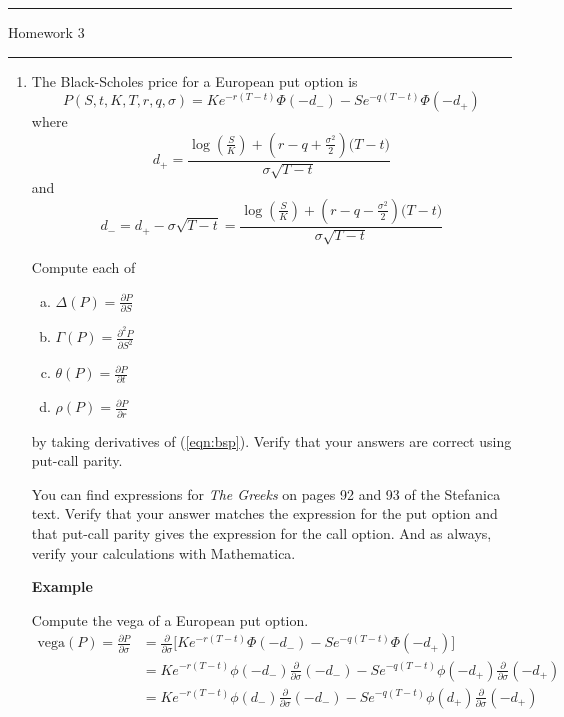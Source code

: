\documentclass[letterpaper,12pt,fleqn]{article}
\theoremstyle{definition}
\begin{document}
\pagestyle{empty}

\hrule \vspace{0.5em}
 \hfill Homework 3 \newline \hrule

\vspace{1em}

\begin{enumerate}
\item The Black-Scholes price for a European put option is
\begin{equation}
P(S, t, K, T, r, q, \sigma) = Ke^{-r(T - t)} \Phi(-d_{-}) - Se^{-q(T - t)} \Phi(-d_{+})
\label{eqn:bsp}
\end{equation}
where
$$d_{+} = \frac{\log\left(\frac{S}{K}\right) + \left(r - q + \frac{\sigma^{2}}{2} \right) \big( T - t \big)}{\sigma \sqrt{T - t}}$$
and
$$d_{-} = d_{+} - \sigma \sqrt{T - t} = \frac{\log\left(\frac{S}{K}\right) + \left(r - q - \frac{\sigma^{2}}{2} \right) \big( T - t \big)}{\sigma \sqrt{T - t}}$$

\vspace{1em}

Compute each of
\begin{enumerate}[(a)]
\item $\displaystyle \Delta(P) = \frac{\partial P}{\partial S}$
\item $\displaystyle \Gamma(P) = \frac{\partial^{2} P}{\partial S^{2}}$
\item $\displaystyle \theta(P) = \frac{\partial P}{\partial t}$
\item $\displaystyle \rho(P) = \frac{\partial P}{\partial r}$
\end{enumerate}

\vspace{1em}

by taking derivatives of (\ref{eqn:bsp}). Verify that your answers are correct using put-call parity.

\vspace{2em}

You can find expressions for \textit{The Greeks} on pages 92 and 93 of the Stefanica text.  Verify that your answer matches the expression for the put option and that put-call parity gives the expression for the call option.  And as always, verify your calculations with Mathematica.



\newpage
\textbf{Example}

Compute the vega of a European put option.
\begin{align*}
\mbox{vega}(P) = \frac{\partial P}{\partial \sigma} &= \frac{\partial}{\partial \sigma} \big[ K e^{-r(T - t)} \Phi(-d_{-}) - Se^{-q(T - t)} \Phi(-d_{+}) \big] \\
&= K e^{-r(T - t)} \phi(-d_{-}) \frac{\partial}{\partial \sigma}(-d_{-}) - Se^{-q(T - t)} \phi(-d_{+}) \frac{\partial}{\partial \sigma}(-d_{+}) \\
&= K e^{-r(T - t)} \phi(d_{-}) \frac{\partial}{\partial \sigma}(-d_{-}) - Se^{-q(T - t)} \phi(d_{+}) \frac{\partial}{\partial \sigma}(-d_{+}) \\
\end{align*}


\end{enumerate}
\end{document}
